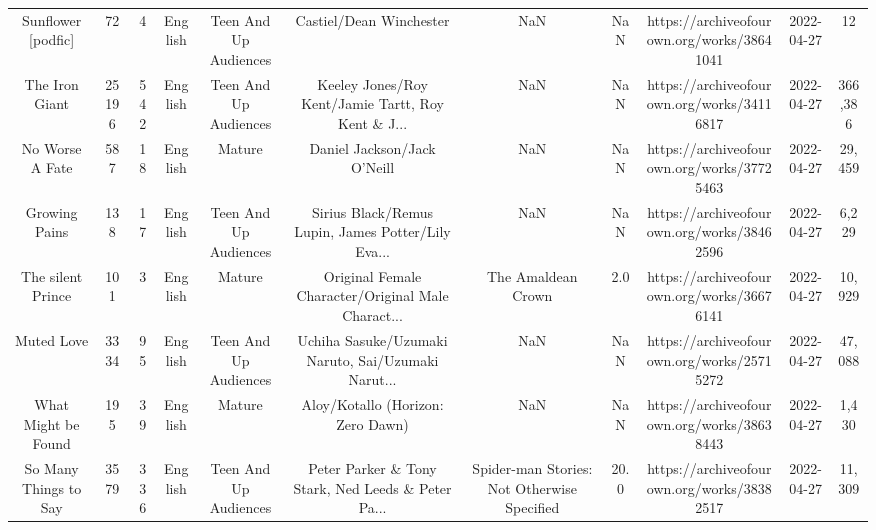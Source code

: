 \begin{table}[h!]
{\begin{tabular}{|c|c|c|c|c|c|c|c|c|c|c|}
                                Sunflower [podfic] &     72 &     4 &  English & Teen And Up Audiences &                            Castiel/Dean Winchester &                                                NaN &   NaN & https://archiveofourown.org/works/38641041 & 2022-04-27 &        12 \\
                                    The Iron Giant &  25196 &   542 &  English & Teen And Up Audiences & Keeley Jones/Roy Kent/Jamie Tartt, Roy Kent \& J... &                                                NaN &   NaN & https://archiveofourown.org/works/34116817 & 2022-04-27 &   366,386 \\
                                   No Worse A Fate &    587 &    18 &  English &                Mature &                        Daniel Jackson/Jack O'Neill &                                                NaN &   NaN & https://archiveofourown.org/works/37725463 & 2022-04-27 &    29,459 \\
                                     Growing Pains &    138 &    17 &  English & Teen And Up Audiences & Sirius Black/Remus Lupin, James Potter/Lily Eva... &                                                NaN &   NaN & https://archiveofourown.org/works/38462596 & 2022-04-27 &     6,229 \\
                                 The silent Prince &    101 &     3 &  English &                Mature & Original Female Character/Original Male Charact... &                                 The Amaldean Crown &   2.0 & https://archiveofourown.org/works/36676141 & 2022-04-27 &    10,929 \\
                                        Muted Love &   3334 &    95 &  English & Teen And Up Audiences & Uchiha Sasuke/Uzumaki Naruto, Sai/Uzumaki Narut... &                                                NaN &   NaN & https://archiveofourown.org/works/25715272 & 2022-04-27 &    47,088 \\
                               What Might be Found &    195 &    39 &  English &                Mature &                  Aloy/Kotallo (Horizon: Zero Dawn) &                                                NaN &   NaN & https://archiveofourown.org/works/38638443 & 2022-04-27 &     1,430 \\
                             So Many Things to Say &   3579 &   336 &  English & Teen And Up Audiences & Peter Parker \& Tony Stark, Ned Leeds \& Peter Pa... &        Spider-man Stories: Not Otherwise Specified &  20.0 & https://archiveofourown.org/works/38382517 & 2022-04-27 &    11,309 \\

\end{tabular}}
\end{table}
